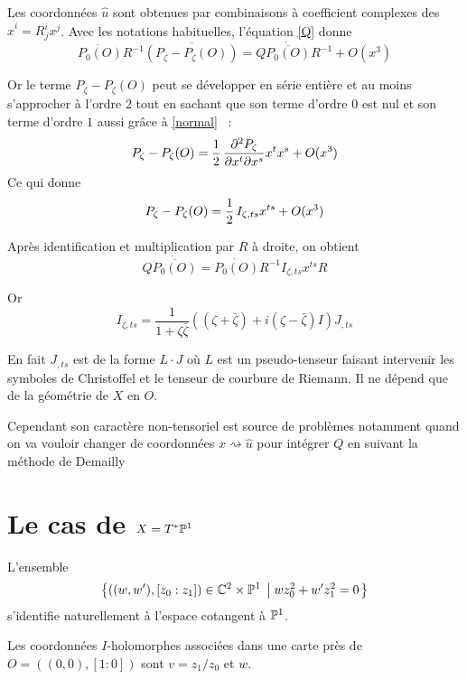 \documentclass[11pt,draft,twocolumn,makeidx]{amsart}
\numberwithin{equation}{subsection}
\begin{document}
Les coordonnées $\hat{u}$ sont obtenues par combinaisons à coefficient complexes des $\hat{x}^i = R^i_j x^j$. Avec les notations habituelles, l'équation \eqref{Q} donne
\begin{equation}
\dot{P_0(O)}R^{-1}\overline{\left(P_\zeta - P_\zeta(O)\right)} = Q\dot{\overline{P_0(O)}}R^{-1}+ O(x^3)
\end{equation}

Or le terme $P_\zeta - P_\zeta(O)$ peut se développer en série entière et au moins s'approcher à l'ordre $2$ tout en sachant que son terme d'ordre $0$ est nul et son terme d'ordre $1$ aussi grâce à \eqref{normal} ~:
\begin{equation}
P_\zeta - P_\zeta(O) = \operatorname{\frac{1}{2}}\dfrac{\partial^2{P_\zeta}}{\partial{x^t}\partial{x^s}}x^tx^s + O(x^3) 
\end{equation}
Ce qui donne
\begin{equation}
P_\zeta - P_\zeta(O) = \operatorname{\frac{1}{2}} I_{\zeta,ts}x^{ts} + O(x^3)
\end{equation}


Après identification et multiplication par $R$ à droite, on obtient
\begin{equation}
Q\dot{\overline{P_0(O)}} = \dot{P_0(O)}R^{-1}I_{\zeta,ts}x^{ts}R
\end{equation}

Or 
\begin{equation}
I_{\zeta,ts} = \dfrac{1}{1+\zeta\bar\zeta}\left(
(\zeta + \bar\zeta) + i(\zeta - \bar\zeta) I
\right)J_{,ts}
\end{equation}

En fait $J_{,ts}$ est de la forme $L \cdot J$ où $L$ est un pseudo-tenseur faisant intervenir les symboles de Christoffel et le tenseur de courbure de Riemann. Il ne dépend que de la géométrie de $X$ en $O$.

Cependant son caractère non-tensoriel est source de problèmes notamment quand on va vouloir changer de coordonnées $x \rightsquigarrow \hat{u}$ pour intégrer $Q$ en suivant la méthode de Demailly \excl


\section{Le cas de $X =T^*\mathbb{P}^1$}
L'ensemble
\begin{equation}
\left\lbrace {\left((w,w'),[z_0:z_1]\right) \in \mathbb{C}^2 \times \mathbb{P}^1} \; \left| \; {wz_0^2+w'z_1^2 = 0} \right. \right\rbrace
\end{equation}
s'identifie naturellement à l'espace cotangent à $\mathbb{P}^1$.

Les coordonnées $I$-holomorphes associées dans une carte près de $O = ((0,0),[1:0])$ sont $v = z_1 / z_0$ et $w$.
\end{document}
